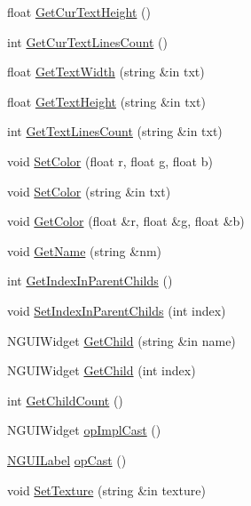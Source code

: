 \begin{DoxyCompactItemize}
\item 
float \hyperlink{class_n_g_u_i_label_ae4a257eb190fa67d29502125a830572c}{Get\+Cur\+Text\+Height} ()
\item 
int \hyperlink{class_n_g_u_i_label_accc156ab5abe647df17276b1eed54d82}{Get\+Cur\+Text\+Lines\+Count} ()
\item 
float \hyperlink{class_n_g_u_i_label_a9de9554329092f709757eff7dd1350b2}{Get\+Text\+Width} (string \&in txt)
\item 
float \hyperlink{class_n_g_u_i_label_a127aba476903cc5416eecf89805a2df9}{Get\+Text\+Height} (string \&in txt)
\item 
int \hyperlink{class_n_g_u_i_label_a129b4dd6356803814ab41fdfb04b9d94}{Get\+Text\+Lines\+Count} (string \&in txt)
\item 
void \hyperlink{class_n_g_u_i_label_a36c48465b9f84282ec9c1e679317e3b2}{Set\+Color} (float r, float g, float b)
\item 
void \hyperlink{class_n_g_u_i_label_ae338445badab040ff52c96284737ab10}{Set\+Color} (string \&in txt)
\item 
void \hyperlink{class_n_g_u_i_label_a707bbe6791ef6613a47ccf1146a3295e}{Get\+Color} (float \&r, float \&g, float \&b)
\item 
void \hyperlink{class_n_g_u_i_label_a151738ce22b2abd0388d2101964ad405}{Get\+Name} (string \&nm)
\item 
int \hyperlink{class_n_g_u_i_label_af6fd4fc621c2db410b3328adbe96e29d}{Get\+Index\+In\+Parent\+Childs} ()
\item 
void \hyperlink{class_n_g_u_i_label_a0d82c546be7c09e4877c757939db7b69}{Set\+Index\+In\+Parent\+Childs} (int index)
\item 
N\+G\+U\+I\+Widget \hyperlink{class_n_g_u_i_label_a5914d2aaa7fac4d371f0283d688515d7}{Get\+Child} (string \&in name)
\item 
N\+G\+U\+I\+Widget \hyperlink{class_n_g_u_i_label_a879e8b9b76af23541b1528335c3ce062}{Get\+Child} (int index)
\item 
int \hyperlink{class_n_g_u_i_label_a4456fdbb51dd15a559e078b314a2211f}{Get\+Child\+Count} ()
\item 
N\+G\+U\+I\+Widget \hyperlink{class_n_g_u_i_label_a93fe70bfa635afdd09250434cdd454c2}{op\+Impl\+Cast} ()
\item 
\hyperlink{class_n_g_u_i_label}{N\+G\+U\+I\+Label} \hyperlink{class_n_g_u_i_label_aa75ddad519625ffd41f1606754bb6754}{op\+Cast} ()
\item 
void \hyperlink{class_n_g_u_i_label_ad6809d5317f3013a693954232e03b60b}{Set\+Texture} (string \&in texture)

\end{DoxyCompactItemize}
